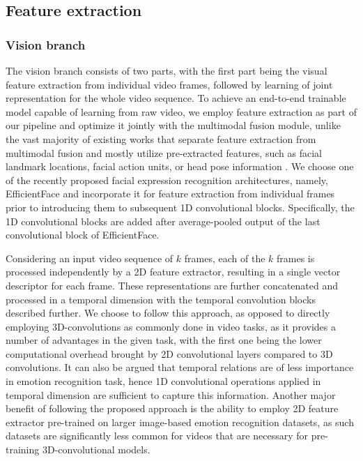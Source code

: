 \documentclass[a4paper,conference]{IEEEtran}
\begin{document}
\subsection{Feature extraction}

\subsubsection{Vision branch}

The vision branch consists of two parts, with the first part being the visual feature extraction from individual video frames, followed by learning of joint representation for the whole video sequence. To achieve an end-to-end trainable model capable of learning from raw video, we employ feature extraction as part of our pipeline and optimize it jointly with the multimodal fusion module, unlike the vast majority of existing works that separate feature extraction from multimodal fusion and mostly utilize pre-extracted features, such as facial landmark locations, facial action units, or head pose information \cite{mult, icasspav}. We choose one of the recently proposed facial expression recognition architectures, namely, EfficientFace \cite{efficientface} and incorporate it for feature extraction from individual frames prior to introducing them to subsequent 1D convolutional blocks. Specifically, the 1D convolutional blocks are added after average-pooled output of the last convolutional block of EfficientFace.

Considering an input video sequence of $k$ frames, each of the $k$ frames is processed independently by a 2D feature extractor, resulting in a single vector descriptor for each frame. These representations are further concatenated and processed in a temporal dimension with the temporal convolution blocks described further. We choose to follow this approach, as opposed to directly employing 3D-convolutions as commonly done in video tasks, as it provides a number of advantages in the given task, with the first one being the lower computational overhead brought by 2D convolutional layers compared to 3D convolutions. It can also be argued that temporal relations are of less importance in emotion recognition task, hence 1D convolutional operations applied in temporal dimension are sufficient to capture this information. Another major benefit of following the proposed approach is the ability to employ 2D feature extractor pre-trained on larger image-based emotion recognition datasets, as such datasets are significantly less common for videos that are necessary for pre-training 3D-convolutional models. 
\end{document}
